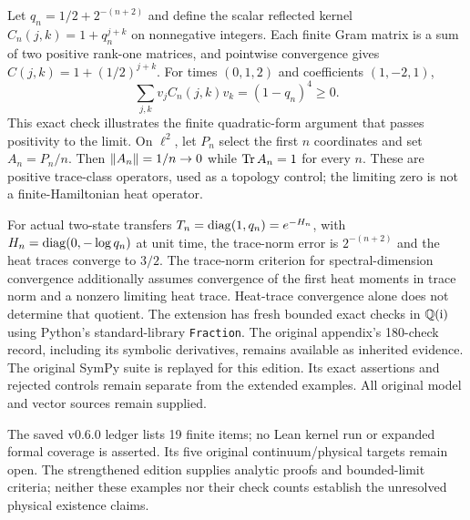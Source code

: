 Let $q_n=1/2+2^{-(n+2)}$ and define the scalar reflected kernel $C_n(j,k)=1+q_n^{j+k}$ on nonnegative integers. Each finite Gram matrix is a sum of two positive rank-one matrices, and pointwise convergence gives $C(j,k)=1+(1/2)^{j+k}$. For times $(0,1,2)$ and coefficients $(1,-2,1)$,
\[
\sum_{j,k}v_jC_n(j,k)v_k=(1-q_n)^4\geq0.
\]
This exact check illustrates the finite quadratic-form argument that passes positivity to the limit.
On $\ell^2$, let $P_n$ select the first $n$ coordinates and set $A_n=P_n/n$. Then $\left\lVert A_n\right\rVert=1/n\to0$ while $\operatorname{Tr} A_n=1$ for every $n$. These are positive trace-class operators, used as a topology control; the limiting zero is not a finite-Hamiltonian heat operator.

For actual two-state transfers $T_n=\operatorname{diag}(1,q_n)=e^{-H_n}$, with $H_n=\operatorname{diag}(0,-\log q_n)$ at unit time, the trace-norm error is $2^{-(n+2)}$ and the heat traces converge to $3/2$. The trace-norm criterion for spectral-dimension convergence additionally assumes convergence of the first heat moments in trace norm and a nonzero limiting heat trace. Heat-trace convergence alone does not determine that quotient.
The extension has fresh bounded exact checks in $\QQ(\ii)$ using Python's standard-library \texttt{Fraction}. The original appendix's 180-check record, including its symbolic derivatives, remains available as inherited evidence. The original SymPy suite is replayed for this edition. Its exact assertions and rejected controls remain separate from the extended examples. All original model and vector sources remain supplied.

The saved v0.6.0 ledger lists 19 finite items; no Lean kernel run or expanded formal coverage is asserted. Its five original continuum/physical targets remain open. The strengthened edition supplies analytic proofs and bounded-limit criteria; neither these examples nor their check counts establish the unresolved physical existence claims.

\endgroup
